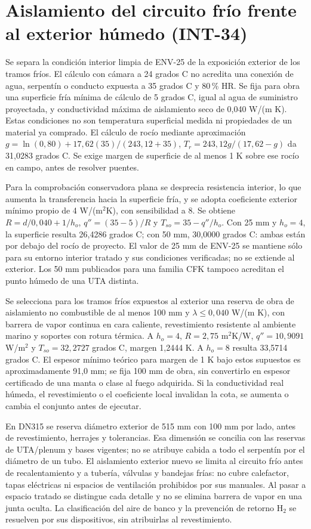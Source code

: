 \section{Aislamiento del circuito frío frente al exterior húmedo (INT-34)}
\label{sec:sd4-anticondensacion-int34}
Se separa la condición interior limpia de ENV-25 de la exposición exterior de los tramos fríos. El cálculo con cámara a 24 grados C no acredita una conexión de agua, serpentín o conducto expuesta a 35 grados C y 80\,\% HR. Se fija para obra una superficie fría mínima de cálculo de 5 grados C, igual al agua de suministro proyectada, y conductividad máxima de aislamiento seco de 0,040 W/(m K). Estas condiciones no son temperatura superficial medida ni propiedades de un material ya comprado. El cálculo de rocío mediante aproximación $g=\ln(0,80)+17,62(35)/(243,12+35)$, $T_r=243,12g/(17,62-g)$ da 31,0283 grados C. Se exige margen de superficie de al menos 1 K sobre ese rocío en campo, antes de resolver puentes.

Para la comprobación conservadora plana se desprecia resistencia interior, lo que aumenta la transferencia hacia la superficie fría, y se adopta coeficiente exterior mínimo propio de 4 W/(m$^2$K), con sensibilidad a 8. Se obtiene $R=d/0,040+1/h_o$, $q''=(35-5)/R$ y $T_{so}=35-q''/h_o$. Con 25 mm y $h_o=4$, la superficie resulta 26,4286 grados C; con 50 mm, 30,0000 grados C: ambas están por debajo del rocío de proyecto. El valor de 25 mm de ENV-25 se mantiene sólo para su entorno interior tratado y sus condiciones verificadas; no se extiende al exterior. Los 50 mm publicados para una familia CFK tampoco acreditan el punto húmedo de una UTA distinta.

Se selecciona para los tramos fríos expuestos al exterior una reserva de obra de aislamiento no combustible de al menos 100 mm y $\lambda\le0,040$ W/(m K), con barrera de vapor continua en cara caliente, revestimiento resistente al ambiente marino y soportes con rotura térmica. A $h_o=4$, $R=2,75$ m$^2$K/W, $q''=10,9091$ W/m$^2$ y $T_{so}=32,2727$ grados C, margen 1,2444 K. A $h_o=8$ resulta 33,5714 grados C. El espesor mínimo teórico para margen de 1 K bajo estos supuestos es aproximadamente 91,0 mm; se fija 100 mm de obra, sin convertirlo en espesor certificado de una manta o clase al fuego adquirida. Si la conductividad real húmeda, el revestimiento o el coeficiente local invalidan la cota, se aumenta o cambia el conjunto antes de ejecutar.

En DN315 se reserva diámetro exterior de 515 mm con 100 mm por lado, antes de revestimiento, herrajes y tolerancias. Esa dimensión se concilia con las reservas de UTA/plenum y bases vigentes; no se atribuye cabida a todo el serpentín por el diámetro de un tubo. El aislamiento exterior nuevo se limita al circuito frío antes de recalentamiento y a tubería, válvulas y bandejas frías: no cubre calefactor, tapas eléctricas ni espacios de ventilación prohibidos por sus manuales. Al pasar a espacio tratado se distingue cada detalle y no se elimina barrera de vapor en una junta oculta. La clasificación del aire de banco y la prevención de retorno H$_2$ se resuelven por sus dispositivos, sin atribuirlas al revestimiento.

